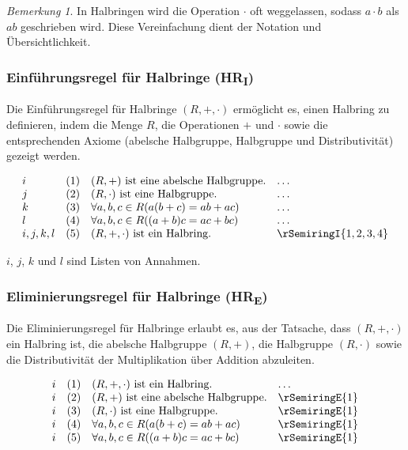 \documentclass{book}
\theoremstyle{plain}
\theoremstyle{remark}
\newtheorem*{remark}{Bemerkung}
\theoremstyle{definition}
\begin{document}
\begin{remark}
    In Halbringen wird die Operation \(\cdot\) oft weggelassen, sodass \(a \cdot b\) als \(ab\) geschrieben wird. Diese Vereinfachung dient der Notation und Übersichtlichkeit.
\end{remark}

\subsubsection*{Einführungsregel für Halbringe (HR\textsubscript{I})}
\label{rule:rSemiringI}
Die Einführungsregel für Halbringe \((R, +, \cdot)\) ermöglicht es, einen Halbring zu definieren, indem die Menge \(R\), die Operationen \(+\) und \(\cdot\) sowie die entsprechenden Axiome (abelsche Halbgruppe, Halbgruppe und Distributivität) gezeigt werden.

\[
\begin{array}{llll}
    i       & (1) & (R, +) \text{ ist eine abelsche Halbgruppe.} & \dots \\
    j       & (2) & (R, \cdot) \text{ ist eine Halbgruppe.} & \dots \\
    k       & (3) & \forall a, b, c \in R (a(b + c)=ab+ac) & \dots \\
    l       & (4) & \forall a, b, c \in R ((a + b)c=ac+bc) & \dots \\
    i,j,k,l   & (5) & (R, +, \cdot) \text{ ist ein Halbring.} & \rSemiringI{1,2,3,4}
\end{array}
\]

\(i\), \(j\), \(k\) und \(l\) sind Listen von Annahmen.

\subsubsection*{Eliminierungsregel für Halbringe (HR\textsubscript{E})}
\label{rule:rSemiringE}
Die Eliminierungsregel für Halbringe erlaubt es, aus der Tatsache, dass \((R, +, \cdot)\) ein Halbring ist, die abelsche Halbgruppe \((R, +)\), die Halbgruppe \((R, \cdot)\) sowie die Distributivität der Multiplikation über Addition abzuleiten.

\[
\begin{array}{llll}
    i       & (1) & (R, +, \cdot) \text{ ist ein Halbring.} & \dots \\
    i       & (2) & (R, +) \text{ ist eine abelsche Halbgruppe.} & \rSemiringE{1} \\
    i       & (3) & (R, \cdot) \text{ ist eine Halbgruppe.} & \rSemiringE{1} \\
    i       & (4) & \forall a, b, c \in R (a(b + c)=ab+ac) & \rSemiringE{1} \\
    i       & (5) & \forall a, b, c \in R ((a + b)c=ac+bc) & \rSemiringE{1}
\end{array}
\]
\end{document}
